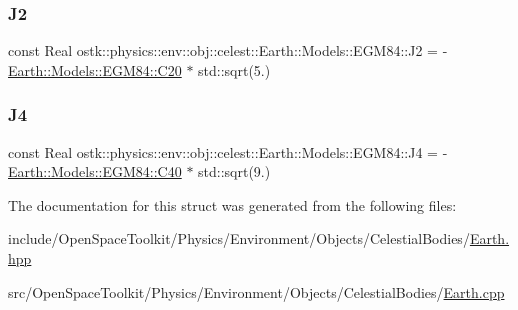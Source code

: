 \mbox{\label{structostk_1_1physics_1_1env_1_1obj_1_1celest_1_1_earth_1_1_models_1_1_e_g_m84_a98c6150b7c55df8e9c995bb30d897e1b}} 
\subsubsection{\texorpdfstring{J2}{J2}}
{\footnotesize\ttfamily const Real ostk\+::physics\+::env\+::obj\+::celest\+::\+Earth\+::\+Models\+::\+E\+G\+M84\+::\+J2 = -\/\hyperlink{structostk_1_1physics_1_1env_1_1obj_1_1celest_1_1_earth_1_1_models_1_1_e_g_m84_ac1165ee364cac2d3c55f779cc95bd6f0}{Earth\+::\+Models\+::\+E\+G\+M84\+::\+C20} $\ast$ std\+::sqrt(5.)\hspace{0.3cm}{\ttfamily [static]}}

\mbox{\label{structostk_1_1physics_1_1env_1_1obj_1_1celest_1_1_earth_1_1_models_1_1_e_g_m84_a3bab15ec6ebd41cfa191526da7b9a5b3}} 
\subsubsection{\texorpdfstring{J4}{J4}}
{\footnotesize\ttfamily const Real ostk\+::physics\+::env\+::obj\+::celest\+::\+Earth\+::\+Models\+::\+E\+G\+M84\+::\+J4 = -\/\hyperlink{structostk_1_1physics_1_1env_1_1obj_1_1celest_1_1_earth_1_1_models_1_1_e_g_m84_abecab6f1755e1e19365f3f1d8eedc250}{Earth\+::\+Models\+::\+E\+G\+M84\+::\+C40} $\ast$ std\+::sqrt(9.)\hspace{0.3cm}{\ttfamily [static]}}



The documentation for this struct was generated from the following files\+:\begin{DoxyCompactItemize}
\item 
include/\+Open\+Space\+Toolkit/\+Physics/\+Environment/\+Objects/\+Celestial\+Bodies/\hyperlink{_objects_2_celestial_bodies_2_earth_8hpp}{Earth.\+hpp}\item 
src/\+Open\+Space\+Toolkit/\+Physics/\+Environment/\+Objects/\+Celestial\+Bodies/\hyperlink{_objects_2_celestial_bodies_2_earth_8cpp}{Earth.\+cpp}\end{DoxyCompactItemize}
